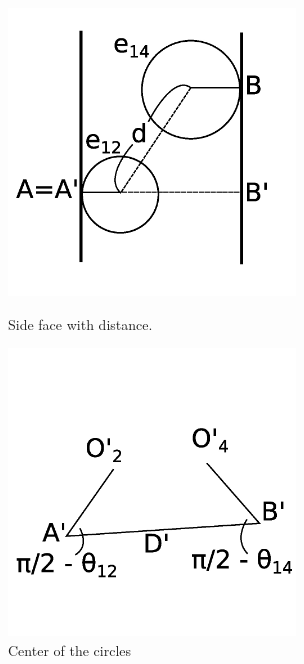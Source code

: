\documentclass[suppldata, dvipdfmx]{interact}
\theoremstyle{plain}%
\theoremstyle{definition}
\theoremstyle{remark}
\theoremstyle{problemstyle}
\begin{document}
\begin{figure}[h!tbp]
 \begin{minipage}[t]{0.5\textwidth}
  \centering
  \includegraphics[width=3in, height=3in,
  keepaspectratio]{./img/HexahedraWithSphericalFaces/sideSliceDistance.jpg}
  \caption{Side face with distance.}
  \label{fig:sideSliceDistance}
 \end{minipage}
 \hspace*{\fill}
 \begin{minipage}[t]{0.5\textwidth}
  \centering
  \includegraphics[width=3in, height=3in,
  keepaspectratio]{./img/HexahedraWithSphericalFaces/adb.jpg}
  \caption{Center of the circles}
  \label{fig:adb}
 \end{minipage}
 \hspace*{\fill}
\end{figure}
\end{document}
